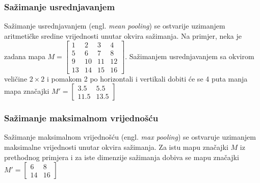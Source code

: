 \documentclass[times, utf8, zavrsni, numeric]{fer}
\begin{document}
\subsubsection{Sažimanje usrednjavanjem}
Sažimanje usrednjavanjem (engl. \textit{mean pooling}) se ostvarije uzimanjem aritmetičke sredine vrijednosti unutar okvira sažimanja. Na primjer, neka je zadana mapa $M = \left[
\begin{matrix}
1 & 2 & 3 & 4 \\
5 & 6 & 7 & 8 \\ 
9 & 10 & 11 & 12 \\
13 & 14 & 15 & 16
\end{matrix} \right]
$.
Sažimanjem usrednjavanjem sa okvirom veličine $2 \times 2$ i pomakom 2 po horizontali i vertikali dobiti će se 4 puta manja mapa značajki $M' = \left[
\begin{matrix}
3.5 & 5.5 \\
11.5 & 13.5
\end{matrix} \right]
$

\subsubsection{Sažimanje maksimalnom vrijednošću}
Sažimanje maksimalnom vrijednošću (engl. \textit{max pooling}) se ostvaruje uzimanjem maksimalne vrijednosti unutar okvira sažimanja. Za istu mapu značajki $M$ iz prethodnog primjera i za iste dimenzije sažimanja dobiva se mapu značajki $M' = \left[
\begin{matrix}
6 & 8 \\
14 & 16
\end{matrix} \right]
$
\end{document}
